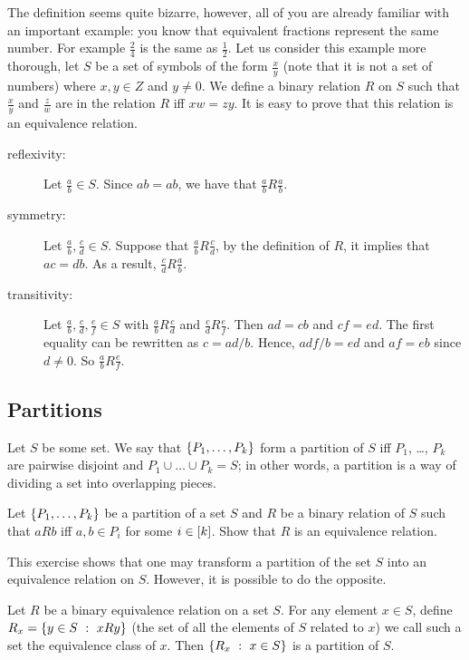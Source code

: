 The definition seems quite bizarre, however, all of you are already familiar
with an important example: you know that equivalent fractions represent the
same number. For example $\frac{2}{4}$ is the same as $\frac{1}{2}$.
Let us consider this example more thorough, let $S$ be a set of symbols of the
form $\frac{x}{y}$ (note that it is not a set of numbers) where $x, y \in Z$
and $y \neq 0$. We define a binary relation $R$ on $S$ such that
$\frac{x}{y}$ and $\frac{z}{w}$ are in the relation $R$ iff $xw = zy$.
It is easy to prove that this relation is an equivalence relation.
\begin{description}
  \item[reflexivity:] Let $\frac{a}{b} \in S$. Since $ab = ab$, we have that
    $\frac{a}{b} R \frac{a}{b}$.
  \item[symmetry:] Let $\frac{a}{b}, \frac{c}{d} \in S$. Suppose that
    $\frac{a}{b} R \frac{c}{d}$, by the definition of $R$, it implies that
    $ac = db$. As a result, $\frac{c}{d} R \frac{a}{b}$.
  \item[transitivity:] Let $\frac{a}{b}, \frac{c}{d}, \frac{e}{f} \in S$ with
    $\frac{a}{b} R \frac{c}{d}$ and $\frac{c}{d} R \frac{e}{f}$. Then
    $ad = cb$ and $cf = ed$. The first equality can be rewritten as $c = ad / b$.
    Hence, $adf / b = ed$ and $af = eb$ since $d \neq 0$. So $\frac{a}{b} R
    \frac{e}{f}$.
\end{description}

\subsection{Partitions}
Let $S$ be some set. We say that $\set{P_1, \dots, P_k}$ form a partition of
$S$ iff $P_1$, \dots, $P_k$ are pairwise disjoint and
$P_1 \cup \dots \cup P_k = S$; in other words, a partition is a way of dividing
a set into overlapping pieces.

\begin{exercise}
  Let $\set{P_1, \dots, P_k}$ be a partition of a set $S$ and $R$ be a binary
  relation of $S$ such that $a R b$ iff $a, b \in P_i$ for some $i \in [{k}]$.
  Show that $R$ is an equivalence relation.
\end{exercise}

This exercise shows that one may transform a partition of the set $S$ into an
equivalence relation on $S$. However, it is possible to do the opposite.
\begin{theorem}
\label{theorem:partition}
  Let $R$ be a binary equivalence relation on a set $S$. For any element $x \in
  S$, define $R_x = \set[x R y]{y \in S}$ (the set of all the elements of $S$
  related to $x$) we call such a set the equivalence class of $x$.
  Then $\set[x \in S]{R_x}$ is a partition of $S$.
\end{theorem}

